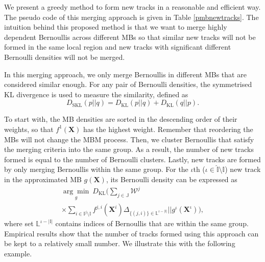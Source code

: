 \documentclass[journal]{IEEEtran}
\begin{document}
We present a greedy method to form new tracks in a reasonable and efficient way. The pseudo code of this merging approach is given in Table \ref{pmbnewtracks}. The intuition behind this proposed method is that we want to merge highly dependent Bernoullis across different MBs so that similar new tracks will not be formed in the same local region and new tracks with significant different Bernoulli densities will not be merged.

In this merging approach, we only merge Bernoullis in different MBs that are considered similar enough. For any pair of Bernoulli densities, the symmetrised KL divergence is used to measure the similarity, defined as
\begin{equation}
    D_{\text{SKL}}(p||q) = D_{\text{KL}}(p||q) + D_{\text{KL}}(q||p). 
\end{equation}

To start with, the MB densities are sorted in the descending order of their weights, so that $f^1(\mathbf{X})$ has the highest weight. Remember that reordering the MBs will not change the MBM process. Then, we cluster Bernoullis that satisfy the merging criteria into the same group. As a result, the number of new tracks formed is equal to the number of Bernoulli clusters. Lastly, new tracks are formed by only merging Bernoullis within the same group. For the $\iota$th ($\iota\in\hat{\mathbb{I}}\setminus\mathbb{I}$) new track in the approximated MB $g(\mathbf{X})$, its Bernoulli density can be expressed as
\begin{multline}
\underset{g}{\arg\min}~D_{\text{KL}} \bigg(  \sum_{j\in\mathbb{J}}\mathcal{W}^j\\\times\sum_{i\in\mathbb{I}^j\setminus\mathbb{I}}f^{j,i}(\mathbf{X}^i)\Delta_{\{(j,i)\}\in\mathbb{L}^{\iota-|\mathbb{I}|}} ||g^{\iota}(\mathbf{X}^{\iota}) \bigg),
    \label{eq:approxnewtrack}
\end{multline}
where set $\mathbb{L}^{\iota-|\mathbb{I}|}$ contains indices of Bernoullis that are within the same group. Empirical results show that the number of tracks formed using this approach can be kept to a relatively small number. We illustrate this with the following example. 
\end{document}
